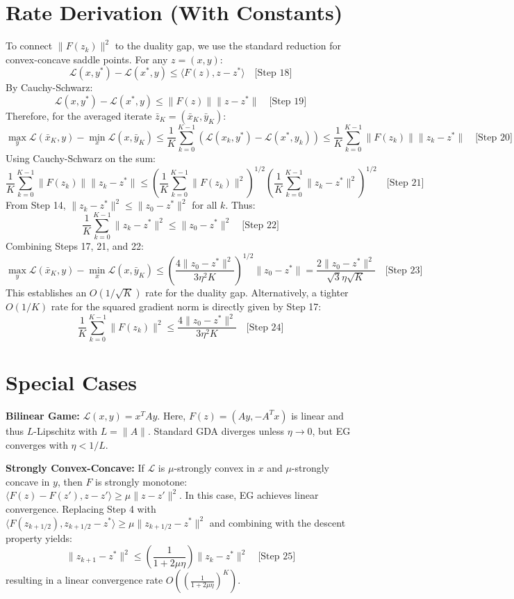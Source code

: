 \documentclass{article}
\begin{document}
\section*{Rate Derivation (With Constants)}
To connect $\|F(z_k)\|^2$ to the duality gap, we use the standard reduction for convex-concave saddle points. For any $z = (x, y)$:
$$ \mathcal{L}(x, y^*) - \mathcal{L}(x^*, y) \leq \langle F(z), z - z^* \rangle \quad \text{[Step 18]} $$
By Cauchy-Schwarz:
$$ \mathcal{L}(x, y^*) - \mathcal{L}(x^*, y) \leq \|F(z)\| \|z - z^*\| \quad \text{[Step 19]} $$
Therefore, for the averaged iterate $\bar{z}_K = (\bar{x}_K, \bar{y}_K)$:
$$ \max_{y} \mathcal{L}(\bar{x}_K, y) - \min_{x} \mathcal{L}(x, \bar{y}_K) \leq \frac{1}{K} \sum_{k=0}^{K-1} \left( \mathcal{L}(x_k, y^*) - \mathcal{L}(x^*, y_k) \right) \leq \frac{1}{K} \sum_{k=0}^{K-1} \|F(z_k)\| \|z_k - z^*\| \quad \text{[Step 20]} $$
Using Cauchy-Schwarz on the sum:
$$ \frac{1}{K} \sum_{k=0}^{K-1} \|F(z_k)\| \|z_k - z^*\| \leq \left( \frac{1}{K} \sum_{k=0}^{K-1} \|F(z_k)\|^2 \right)^{1/2} \left( \frac{1}{K} \sum_{k=0}^{K-1} \|z_k - z^*\|^2 \right)^{1/2} \quad \text{[Step 21]} $$
From Step 14, $\|z_k - z^*\|^2 \leq \|z_0 - z^*\|^2$ for all $k$. Thus:
$$ \frac{1}{K} \sum_{k=0}^{K-1} \|z_k - z^*\|^2 \leq \|z_0 - z^*\|^2 \quad \text{[Step 22]} $$
Combining Steps 17, 21, and 22:
$$ \max_{y} \mathcal{L}(\bar{x}_K, y) - \min_{x} \mathcal{L}(x, \bar{y}_K) \leq \left( \frac{4 \|z_0 - z^*\|^2}{3\eta^2 K} \right)^{1/2} \|z_0 - z^*\| = \frac{2 \|z_0 - z^*\|^2}{\sqrt{3} \eta \sqrt{K}} \quad \text{[Step 23]} $$
This establishes an $O(1/\sqrt{K})$ rate for the duality gap. Alternatively, a tighter $O(1/K)$ rate for the squared gradient norm is directly given by Step 17:
$$ \frac{1}{K} \sum_{k=0}^{K-1} \|F(z_k)\|^2 \leq \frac{4 \|z_0 - z^*\|^2}{3\eta^2 K} \quad \text{[Step 24]} $$

\section*{Special Cases}
\textbf{Bilinear Game:} $\mathcal{L}(x, y) = x^T A y$. Here, $F(z) = (Ay, -A^T x)$ is linear and thus $L$-Lipschitz with $L = \|A\|$. Standard GDA diverges unless $\eta \to 0$, but EG converges with $\eta < 1/L$.

\textbf{Strongly Convex-Concave:} If $\mathcal{L}$ is $\mu$-strongly convex in $x$ and $\mu$-strongly concave in $y$, then $F$ is strongly monotone: $\langle F(z) - F(z'), z - z' \rangle \geq \mu \|z - z'\|^2$. In this case, EG achieves linear convergence. Replacing Step 4 with $\langle F(z_{k+1/2}), z_{k+1/2} - z^* \rangle \geq \mu \|z_{k+1/2} - z^*\|^2$ and combining with the descent property yields:
$$ \|z_{k+1} - z^*\|^2 \leq \left( \frac{1}{1 + 2\mu\eta} \right) \|z_k - z^*\|^2 \quad \text{[Step 25]} $$
resulting in a linear convergence rate $O\left( \left(\frac{1}{1+2\mu\eta}\right)^K \right)$.
\end{document}
